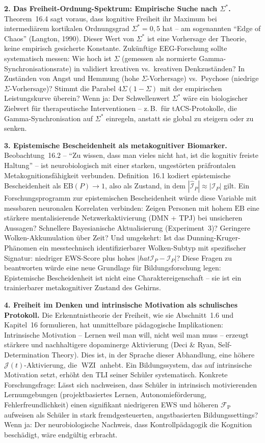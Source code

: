 ﻿\documentclass[12pt,a4paper]{report}
\theoremstyle{plain}
\theoremstyle{definition}
\theoremstyle{remark}
\DeclareMathOperator{\WZI}{WZI}
\begin{document}
	\textbf{2. Das Freiheit-Ordnung-Spektrum: Empirische Suche nach $\Sigma^*$.}
	Theorem~16.4 sagt voraus, dass kognitive Freiheit ihr Maximum bei
	intermediärem kortikalen Ordnungsgrad $\Sigma^* = 0{,}5$ hat --
	am sogenannten ``Edge of Chaos'' (Langton, 1990).
	Dieser Wert von $\Sigma^*$ ist eine Vorhersage der Theorie,
	keine empirisch gesicherte Konstante.
	Zukünftige EEG-Forschung sollte systematisch messen:
	Wie hoch ist $\Sigma$ (gemessen als normierte Gamma-Synchronisationsrate)
	in validiert kreativen vs.\ kreativen Denkzuständen?
	In Zuständen von Angst und Hemmung (hohe $\Sigma$-Vorhersage)
	vs.\ Psychose (niedrige $\Sigma$-Vorhersage)?
	Stimmt die Parabel $4\Sigma(1-\Sigma)$ mit der empirischen
	Leistungskurve überein?
	Wenn ja: Der Schwellenwert $\Sigma^*$ wäre ein biologischer
	Zielwert für therapeutische Interventionen -- z.\,B.\ für
	tACS-Protokolle, die Gamma-Synchronisation auf $\Sigma^*$
	einregeln, anstatt sie global zu steigern oder zu senken.

	\textbf{3. Epistemische Bescheidenheit als metakognitiver Biomarker.}
	Beobachtung~16.2 -- ``Zu wissen, dass man vieles nicht hat,
	ist die kognitiv freiste Haltung'' -- ist neurobiologisch mit
	einer starken, ungestörten präfrontalen Metakognitionsfähigkeit
	verbunden. Definition~16.1 kodiert epistemische Bescheidenheit
	als $\mathrm{EB}(P) \to 1$, also als Zustand, in dem
	$|\hat{\mathcal{I}}_P| \approx |\mathcal{I}_P|$ gilt.
	Ein Forschungsprogramm zur epistemischen Bescheidenheit
	würde diese Variable mit messbaren neuronalen Korrelaten verbinden:
	Zeigen Personen mit hohem $\mathrm{EB}$ eine stärkere
	mentalisierende Netzwerkaktivierung (DMN + TPJ) bei
	unsicheren Aussagen? Schnellere Bayesianische Aktualisierung
	(Experiment~3)?
	Geringere Wolken-Akkumulation über Zeit?
	Und umgekehrt: Ist das Dunning-Kruger-Phänomen ein messtechnisch
	identifizierbarer Wolken-Subtyp mit spezifischer Signatur:
	niedriger EWS-Score plus hohes $|hat{\mathcal{I}}_P - \mathcal{I}_P|$?
	Diese Fragen zu beantworten würde eine neue Grundlage für
	Bildungsforschung legen: Epistemische Bescheidenheit ist nicht
	eine Charaktereigenschaft -- sie ist ein trainierbarer
	metakognitiver Zustand des Gehirns.

	\textbf{4. Freiheit im Denken und intrinsische Motivation als
		schulisches Protokoll.}
	Die Erkenntnistheorie der Freiheit, wie sie Abschnitt~1.6
	und Kapitel~16 formulieren, hat unmittelbare pädagogische
	Implikationen: Intrinsische Motivation -- Lernen weil man will,
	nicht weil man muss -- erzeugt stärkere und nachhaltigere
	dopaminerge Aktivierung (Deci \& Ryan, Self-Determination Theory).
	Dies ist, in der Sprache dieser Abhandlung, eine höhere
	$\mathcal{J}(t)$-Aktivierung, die $\WZI$ anhebt.
	Ein Bildungssystem, das auf intrinsische Motivation setzt,
	erhöht den TLI seiner Schüler systematisch.
	Konkrete Forschungsfrage: Lässt sich nachweisen, dass Schüler
	in intrinsisch motivierenden Lernumgebungen (projektbasiertes
	Lernen, Autonomieförderung, Fehlerfreundlichkeit) einen
	signifikant niedrigeren EWS und höheren $\mathcal{F}_{\mathrm{P}}$
	aufweisen als Schüler in stark fremdgesteuerten, angstbasierten
	Bildungssettings?
	Wenn ja: Der neurobiologische Nachweis, dass Kontrollpädagogik
	die Kognition beschädigt, wäre endgültig erbracht.
\end{document}
